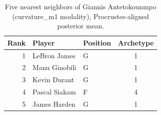 \begin{table}[htbp]
  \centering\small
  \begin{tabular}{rllc}
    \toprule
    Rank & Player & Position & Archetype \\
    \midrule
    1 & LeBron James & G & 1 \\
    2 & Manu Ginobili & G & 1 \\
    3 & Kevin Durant & G & 1 \\
    4 & Pascal Siakam & F & 4 \\
    5 & James Harden & G & 1 \\
    \bottomrule
  \end{tabular}
  \caption{Five nearest neighbors of Giannis Antetokounmpo (curvature_m1 modality), Procrustes-aligned posterior mean.}
  \label{tab:Giannis_Antetokounmpo_neighbors_curvature_m1}
\end{table}


